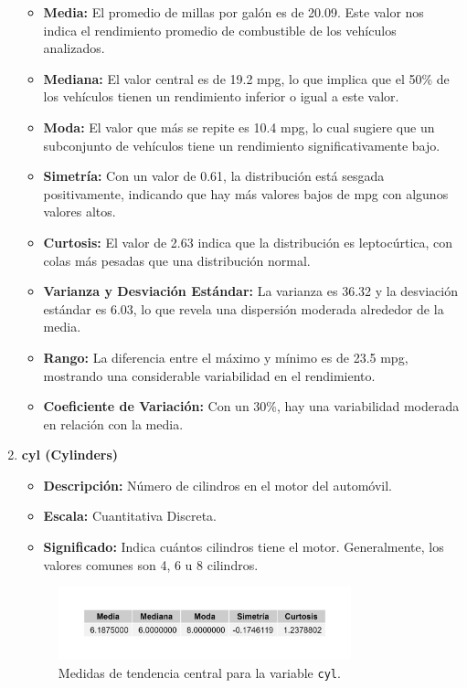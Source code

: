 \documentclass{article}
\begin{document}
\begin{enumerate}
	      \begin{itemize}
		      \item \textbf{Media:} El promedio de millas por galón es de 20.09. Este valor nos indica el rendimiento promedio de combustible de los vehículos analizados.
		      \item \textbf{Mediana:} El valor central es de 19.2 mpg, lo que implica que el 50\% de los vehículos tienen un rendimiento inferior o igual a este valor.
		      \item \textbf{Moda:} El valor que más se repite es 10.4 mpg, lo cual sugiere que un subconjunto de vehículos tiene un rendimiento significativamente bajo.
		      \item \textbf{Simetría:} Con un valor de 0.61, la distribución está sesgada positivamente, indicando que hay más valores bajos de mpg con algunos valores altos.
		      \item \textbf{Curtosis:} El valor de 2.63 indica que la distribución es leptocúrtica, con colas más pesadas que una distribución normal.
		      \item \textbf{Varianza y Desviación Estándar:} La varianza es 36.32 y la desviación estándar es 6.03, lo que revela una dispersión moderada alrededor de la media.
		      \item \textbf{Rango:} La diferencia entre el máximo y mínimo es de 23.5 mpg, mostrando una considerable variabilidad en el rendimiento.
		      \item \textbf{Coeficiente de Variación:} Con un 30\%, hay una variabilidad moderada en relación con la media.
	      \end{itemize}

	\item \textbf{cyl (Cylinders)}

	      \begin{itemize}
		      \item \textbf{Descripción:} Número de cilindros en el motor del automóvil.
		      \item \textbf{Escala:} Cuantitativa Discreta.
		      \item \textbf{Significado:} Indica cuántos cilindros tiene el motor. Generalmente, los valores comunes son 4, 6 u 8 cilindros.
	      \end{itemize}

	      \begin{figure}[H]
		      \centering
		      \includegraphics[width=0.8\textwidth]{MTC/cyl_central.png}
		      \caption{Medidas de tendencia central para la variable \texttt{cyl}.}
		      \label{fig:cyl_central}
	      \end{figure}


\end{enumerate}
\end{document}
